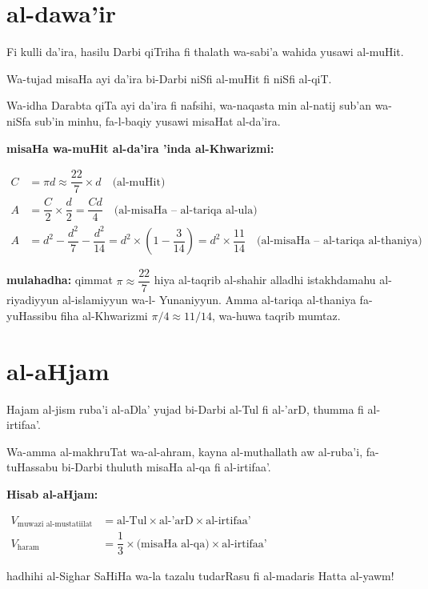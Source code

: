 \documentclass[11pt,a4paper]{book}
\begin{document}
\section{al-dawa'ir}

\begin{originaltext}
Fi kulli da'ira, hasilu Darbi qiTriha fi thalath wa-sabi'a wahida
yusawi al-muHit.

Wa-tujad misaHa ayi da'ira bi-Darbi niSfi al-muHit fi niSfi al-qiT.

Wa-idha Darabta qiTa ayi da'ira fi nafsihi, wa-naqasta min al-natij
sub'an wa-niSfa sub'in minhu, fa-l-baqiy yusawi misaHat al-da'ira.
\end{originaltext}

\begin{mathexplain}
\textbf{misaHa wa-muHit al-da'ira 'inda al-Khwarizmi:}

\begin{center}
$\begin{aligned}
  C &= \pi d \approx \dfrac{22}{7} \times d \quad\text{(al-muHit)} \\
  A &= \dfrac{C}{2} \times \dfrac{d}{2} = \dfrac{Cd}{4} \quad\text{(al-misaHa -- al-tariqa al-ula)} \\
  A &= d^2 - \dfrac{d^2}{7} - \dfrac{d^2}{14} = d^2 \times \left(1 - \dfrac{3}{14}\right) = d^2 \times \dfrac{11}{14} \quad\text{(al-misaHa -- al-tariqa al-thaniya)}
\end{aligned}$
\end{center}

\textbf{mulahadha:} qimmat $\pi \approx \dfrac{22}{7}$ hiya al-taqrib
al-shahir alladhi istakhdamahu al-riyadiyyun al-islamiyyun wa-l-
Yunaniyyun. Amma al-tariqa al-thaniya fa-yuHassibu fiha al-Khwarizmi
$\pi/4 \approx 11/14$, wa-huwa taqrib mumtaz.
\end{mathexplain}

\section{al-aHjam}

\begin{originaltext}
Hajam al-jism ruba'i al-aDla' yujad bi-Darbi al-Tul fi al-'arD,
thumma fi al-irtifaa'.

Wa-amma al-makhruTat wa-al-ahram, kayna al-muthallath aw al-ruba'i,
fa-tuHassabu bi-Darbi thuluth misaHa al-qa fi al-irtifaa'.
\end{originaltext}

\begin{mathexplain}
\textbf{Hisab al-aHjam:}

\begin{center}
$\begin{aligned}
  V_{\text{muwazi al-mustatiilat}} &= \text{al-Tul} \times \text{al-'arD} \times \text{al-irtifaa'} \\
  V_{\text{haram}} &= \dfrac{1}{3} \times \text{(misaHa al-qa)} \times \text{al-irtifaa'}
\end{aligned}$
\end{center}

hadhihi al-Sighar SaHiHa wa-la tazalu tudarRasu fi al-madaris Hatta
al-yawm!
\end{mathexplain}
\end{document}
